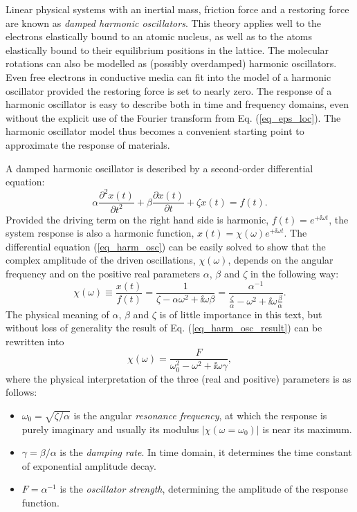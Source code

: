 Linear physical systems with an inertial mass, friction force and a restoring force are known as \textit{damped harmonic oscillators}.  This theory applies well to the electrons elastically bound to an atomic nucleus, as well as to the atoms elastically bound to their equilibrium positions in the lattice. The molecular rotations can also be modelled as (possibly overdamped) harmonic oscillators. Even free electrons in conductive media can fit into the model of a harmonic oscillator provided the restoring force is set to nearly zero. The response of a harmonic oscillator is easy to describe both in time and frequency domains, even without the explicit use of the Fourier transform from Eq. (\ref{eq_eps_loc}). The harmonic oscillator model thus becomes a convenient starting point to approximate the response of materials.

A damped harmonic oscillator is described by a second-order differential equation:
\begin{equation} \alpha \frac{\partial^{2} x(t)}{\partial t^{2}} + \beta\frac{\partial x(t)}{\partial t} + \zeta x(t) = f(t). \label{eq_harm_osc}\end{equation}
Provided the driving term on the right hand side  is harmonic, $f(t) = e^{+\ii \omega t}$, the system response is also a harmonic function, $x(t) = \chi(\omega) e^{+\ii \omega t}$. The differential equation (\ref{eq_harm_osc}) can be easily solved to show that the complex amplitude of the driven oscillations, $\chi(\omega)$, depends on the angular frequency and on the positive real parameters $\alpha$, $\beta$ and $\zeta$ in the following way:
\begin{equation} \chi(\omega) \equiv \frac{x(t)}{f(t)} = \frac{1}{\zeta - \alpha\omega^{2} + \ii\omega\beta}  = \frac{\alpha^{-1}}{\frac{\zeta}{\alpha}-\omega^{2} + \ii\omega\frac{\beta}{\alpha}}. \label{eq_harm_osc_result}\end{equation}
The physical meaning of $\alpha$, $\beta$ and $\zeta$ is of little importance in this text, but without loss of generality the result of Eq. (\ref{eq_harm_osc_result}) can be rewritten into
\begin{equation} \chi(\omega) = \frac{F}{\omega_0^{2}-\omega^{2} + \ii\omega\gamma}, \label{eq_harm_osc_rewritten}\end{equation}
where the physical interpretation of the three (real and positive) parameters is as follows:
\begin{itemize}
 \item{$\omega_0 = \sqrt{\zeta/\alpha}$ is the angular \textit{resonance frequency}, at which the response is purely imaginary and usually its modulus $|\chi(\omega=\omega_0)|$ is near its maximum.} 
 \item{$\gamma = \beta/\alpha$ is the \textit{damping rate}. In time domain, it determines the time constant of exponential amplitude decay. } 
 \item{$F = \alpha^{-1}$ is the \textit{oscillator strength}, determining the amplitude of the response function.}
 \end{itemize}


